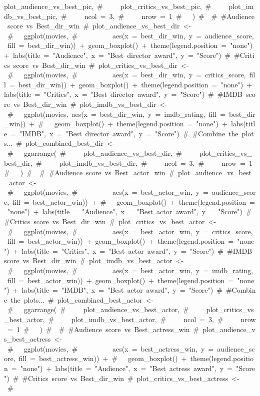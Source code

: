 \documentclass[]{article}
\begin{document}
{plot\_audience\_vs\_best\_pic,\ \#\ \ \ \ \ plot\_critics\_vs\_best\_pic,\ \#\ \ \ \ \ plot\_imdb\_vs\_best\_pic,\ \#\ \ \ \ \ ncol\ =\ 3,\ \#\ \ \ \ \ nrow\ =\ 1\ \#\ \ \ )\ \#\ \ \#\ \#Audience\ score\ vs\ Best\_dir\_win\ \#\ plot\_audience\_vs\_best\_dir\ \textless{}-\ \#\ \ \ ggplot(movies,\ \#\ \ \ \ \ \ \ \ \ \ aes(x\ =\ best\_dir\_win,\ y\ =\ audience\_score,\ fill\ =\ best\_dir\_win))\ +\ geom\_boxplot()\ +\ theme(legend.position\ =\ "none")\ +\ labs(title\ =\ "Audience",\ x\ =\ "Best\ director\ award",\ y\ =\ "Score")\ \#\ \#Critics\ score\ vs\ Best\_dir\_win\ \#\ plot\_critics\_vs\_best\_dir\ \textless{}-\ \#\ \ \ ggplot(movies,\ \#\ \ \ \ \ \ \ \ \ \ aes(x\ =\ best\_dir\_win,\ y\ =\ critics\_score,\ fill\ =\ best\_dir\_win))\ +\ geom\_boxplot()\ +\ theme(legend.position\ =\ "none")\ +\ labs(title\ =\ "Critics",\ x\ =\ "Best\ director\ award",\ y\ =\ "Score")\ \#\ \#IMDB\ score\ vs\ Best\_dir\_win\ \#\ plot\_imdb\_vs\_best\_dir\ \textless{}-\ \#\ \ \ ggplot(movies,\ aes(x\ =\ best\_dir\_win,\ y\ =\ imdb\_rating,\ fill\ =\ best\_dir\_win))\ +\ \#\ \ \ geom\_boxplot()\ +\ theme(legend.position\ =\ "none")\ +\ labs(title\ =\ "IMDB",\ x\ =\ "Best\ director\ award",\ y\ =\ "Score")\ \#\ \#Combine\ the\ plots...\ \#\ plot\_combined\_best\_dir\ \textless{}-\ \#\ \ \ ggarrange(\ \#\ \ \ \ \ plot\_audience\_vs\_best\_dir,\ \#\ \ \ \ \ plot\_critics\_vs\_best\_dir,\ \#\ \ \ \ \ plot\_imdb\_vs\_best\_dir,\ \#\ \ \ \ \ ncol\ =\ 3,\ \#\ \ \ \ \ nrow\ =\ 1\ \#\ \ \ )\ \#\ \ \#\ \#Audience\ score\ vs\ Best\_actor\_win\ \#\ plot\_audience\_vs\_best\_actor\ \textless{}-\ \#\ \ \ ggplot(movies,\ \#\ \ \ \ \ \ \ \ \ \ aes(x\ =\ best\_actor\_win,\ y\ =\ audience\_score,\ fill\ =\ best\_actor\_win))\ +\ \#\ \ \ geom\_boxplot()\ +\ theme(legend.position\ =\ "none")\ +\ labs(title\ =\ "Audience",\ x\ =\ "Best\ actor\ award",\ y\ =\ "Score")\ \#\ \#Critics\ score\ vs\ Best\_dir\_win\ \#\ plot\_critics\_vs\_best\_actor\ \textless{}-\ \#\ \ \ ggplot(movies,\ \#\ \ \ \ \ \ \ \ \ \ aes(x\ =\ best\_actor\_win,\ y\ =\ critics\_score,\ fill\ =\ best\_actor\_win))\ +\ geom\_boxplot()\ +\ theme(legend.position\ =\ "none")\ +\ labs(title\ =\ "Critics",\ x\ =\ "Best\ actor\ award",\ y\ =\ "Score")\ \#\ \#IMDB\ score\ vs\ Best\_dir\_win\ \#\ plot\_imdb\_vs\_best\_actor\ \textless{}-\ \#\ \ \ ggplot(movies,\ \#\ \ \ \ \ \ \ \ \ \ aes(x\ =\ best\_actor\_win,\ y\ =\ imdb\_rating,\ fill\ =\ best\_actor\_win))\ +\ geom\_boxplot()\ +\ theme(legend.position\ =\ "none")\ +\ labs(title\ =\ "IMDB",\ x\ =\ "Best\ actor\ award",\ y\ =\ "Score")\ \#\ \#Combine\ the\ plots...\ \#\ plot\_combined\_best\_actor\ \textless{}-\ \#\ \ \ ggarrange(\ \#\ \ \ \ \ plot\_audience\_vs\_best\_actor,\ \#\ \ \ \ \ plot\_critics\_vs\_best\_actor,\ \#\ \ \ \ \ plot\_imdb\_vs\_best\_actor,\ \#\ \ \ \ \ ncol\ =\ 3,\ \#\ \ \ \ \ nrow\ =\ 1\ \#\ \ \ )\ \#\ \ \#\ \#Audience\ score\ vs\ Best\_actress\_win\ \#\ plot\_audience\_vs\_best\_actress\ \textless{}-\ \#\ \ \ ggplot(movies,\ \#\ \ \ \ \ \ \ \ \ \ aes(x\ =\ best\_actress\_win,\ y\ =\ audience\_score,\ fill\ =\ best\_actress\_win))\ +\ \#\ \ \ geom\_boxplot()\ +\ theme(legend.position\ =\ "none")\ +\ labs(title\ =\ "Audience",\ x\ =\ "Best\ actress\ award",\ y\ =\ "Score")\ \#\ \#Critics\ score\ vs\ Best\_dir\_win\ \#\ plot\_critics\_vs\_best\_actress\ \textless{}-\ \#\ \ \ }
\end{document}
